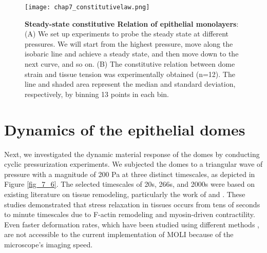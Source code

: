 \begin{figure}[]
	\centering
	\texttt{[image: chap7\_constitutivelaw.png]}
	\caption{\label{fig_7_5}
	\textbf{Steady-state constitutive Relation of epithelial monolayers}: (A) We set up experiments to probe the steady state at different pressures. We will start from the highest pressure, move along the isobaric line and achieve a steady state, and then move down to the next curve, and so on.	(B) The constitutive relation between dome strain and tissue tension was experimentally obtained (n=12). The line and shaded area represent the median and standard deviation, respectively, by binning 13 points in each bin.}
\end{figure}



\vspace{0cm}

\hypertarget{dynamics-of-the-epithelia-domes}{\section{Dynamics of the epithelial domes}\label{dynamics-of-the-epithelial-domes}}




Next, we investigated the dynamic material response of the domes by conducting cyclic pressurization experiments. We subjected the domes to a triangular wave of pressure with a magnitude of 200 Pa at three distinct timescales, as depicted in Figure \ref{fig_7_6}. The selected timescales of 20s, 266s, and 2000s were based on existing literature on tissue remodeling, particularly the work of \citet{khalilgharibi2019} and \citet{casares2015}. These studies demonstrated that stress relaxation in tissues occurs from tens of seconds to minute timescales due to F-actin remodeling and myosin-driven contractility. Even faster deformation rates, which have been studied using different methods \cite{khalilgharibi2019}, are not accessible to the current implementation of MOLI because of the microscope’s imaging speed.

